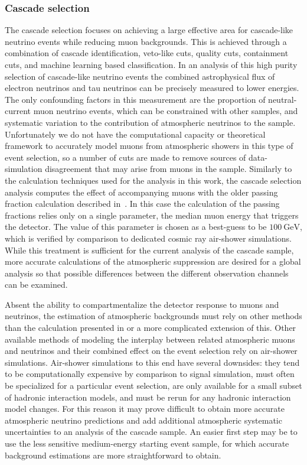 \subsubsection{Cascade selection}
The cascade selection focuses on achieving a large effective area for cascade-like neutrino events while reducing muon backgrounds.
This is achieved through a combination of cascade identification, veto-like cuts, quality cuts, containment cuts, and machine learning based classification.
In an analysis of this high purity selection of cascade-like neutrino events the combined astrophysical flux of electron neutrinos and tau neutrinos can be precisely measured to lower energies.
The only confounding factors in this measurement are the proportion of neutral-current muon neutrino events, which can be constrained with other samples, and systematic variation to the contribution of atmospheric neutrinos to the sample.
Unfortunately we do not have the computational capacity or theoretical framework to accurately model muons from atmospheric showers in this type of event selection, so a number of cuts are made to remove sources of data-simulation disagreement that may arise from muons in the sample.
Similarly to the calculation techniques used for the analysis in this work, the cascade selection analysis computes the effect of accompanying muons with the older passing fraction calculation described in~\cite{Gaisser:2014bja}.
In this case the calculation of the passing fractions relies only on a single parameter, the median muon energy that triggers the detector.
The value of this parameter is chosen as a best-guess to be $\SI{100}\GeV$, which is verified by comparison to dedicated cosmic ray air-shower simulations.
While this treatment is sufficient for the current analysis of the cascade sample, more accurate calculations of the atmospheric suppression are desired for a global analysis so that possible differences between the different observation channels can be examined.

Absent the ability to compartmentalize the detector response to muons and neutrinos, the estimation of atmospheric backgrounds must rely on other methods than the calculation presented in  or a more complicated extension of this.
Other available methods of modeling the interplay between related atmospheric muons and neutrinos and their combined effect on the event selection rely on air-shower simulations.
Air-shower simulations to this end have several downsides: they tend to be computationally expensive by comparison to signal simulation, must often be specialized for a particular event selection, are only available for a small subset of hadronic interaction models, and must be rerun for any hadronic interaction model changes.
For this reason it may prove difficult to obtain more accurate atmospheric neutrino predictions and add additional atmospheric systematic uncertainties to an analysis of the cascade sample.
An easier first step may be to use the less sensitive medium-energy starting event sample, for which accurate background estimations are more straightforward to obtain.

